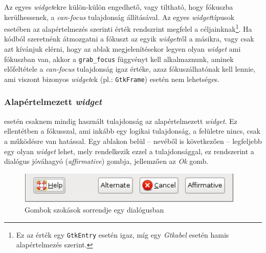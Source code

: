 Az egyes \textit{widget}ekre külön-külön engedhető, vagy tiltható, hogy fókuszba kerülhessenek, a \textit{can-focus} tulajdonság állításával. Az egyes \textit{widget}típusok esetében az alapértelmezés szerinti érték rendszrint megfelel a céljainknak\footnote{Ez az érték egy \texttt{GtkEntry} esetén igaz, míg egy \textit{Gtkabel} esetén hamis alapértelmezés szerint.}. Ha kódból szeretnénk átmozgatni a fókuszt az egyik \textit{widget}ről a másikra, vagy csak azt kívánjuk elérni, hogy az ablak megjelenítésekor legyen olyan \textit{widget} ami fókuszban van, akkor a \texttt{grab\_focus} függvényt kell alkalmaznunk, aminek előfeltétele a \textit{can-focus} tulajdonság igaz értéke, azaz fókuszálhatónak kell lennie, ami viszont bizonyos \textit{widget}ek (pl.: \texttt{GtkFrame}) esetén nem lehetséges.

\subsubsection{Alapértelmezett \textit{widget}}

 esetén csaknem mindig használt tulajdonság az alapértelmezett \textit{widget}. Ez ellentétben a fókusszal, ami inkább egy logikai tulajdonság, a felületre nincs, csak a működésre van hatással. Egy ablakon belül -- nevéből is következően -- legfeljebb egy olyan \textit{widget} lehet, mely rendelkezik ezzel a tulajdonsággal, ez rendszerint a dialógus jóváhagyó (\textit{affirmative}) gombja, jellemzően az \textit{Ok} gomb. 

\begin{figure}[H]
\begin{center}
\includegraphics[height=15mm]{images/button-affirmative.png}
\caption{Gombok szokások sorrendje egy dialógusban\cite{gnomehig}}
\end{center}
\end{figure}

